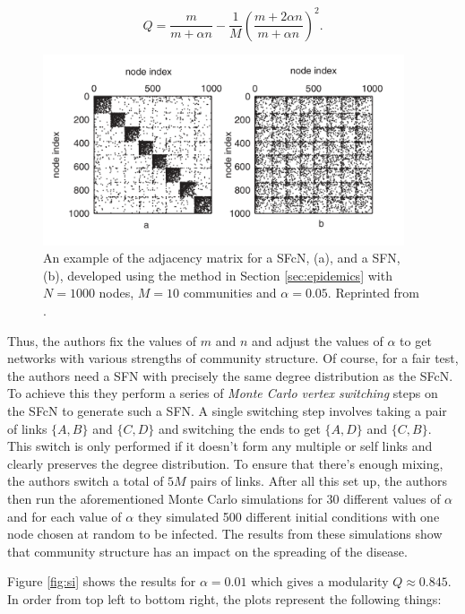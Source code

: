 $$ Q = \frac{m}{m + \alpha n} - \frac{1}{M}\left(\frac{m + 2\alpha n}{m + \alpha n}\right)^2. $$

\begin{figure}
    \begin{center}
        \includegraphics[width=0.95\textwidth]{img/4/sfcns}
    \end{center}
    \caption{An example of the adjacency matrix for a SFcN, (a), and a SFN, (b), developed using the method in Section \ref{sec:epidemics} with $N = 1000$ nodes, $M = 10$ communities and $\alpha = 0.05$. Reprinted from \cite{Huang_2007}.}
    \label{fig:sfcns}
\end{figure}

Thus, the authors fix the values of $m$ and $n$ and adjust the values of $\alpha$ to get networks with various strengths of community structure. Of course, for a fair test, the authors need a SFN with precisely the same degree distribution as the SFcN. To achieve this they perform a series of \emph{Monte Carlo vertex switching} steps on the SFcN to generate such a SFN. A single switching step involves taking a pair of links $\{A, B\}$ and $\{C, D\}$ and switching the ends to get $\{A, D\}$ and $\{C, B\}$. This switch is only performed if it doesn't form any multiple or self links and clearly preserves the degree distribution. To ensure that there's enough mixing, the authors switch a total of $5M$ pairs of links. After all this set up, the authors then run the aforementioned Monte Carlo simulations for 30 different values of $\alpha$ and for each value of $\alpha$ they simulated 500 different initial conditions with one node chosen at random to be infected. The results from these simulations show that community structure has an impact on the spreading of the disease.

\newpage
Figure \ref{fig:si} shows the results for $\alpha = 0.01$ which gives a modularity $Q \approx 0.845$. In order from top left to bottom right, the plots represent the following things:

